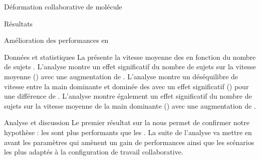 \documentclass[myfrancais,ngerman,english,frenchb]{mythesis}
\begin{document}
\begin{mychapter}{Déformation collaborative de molécule}
\begin{mysection}{Résultats}
\begin{mysubsection}{Amélioration des performances en }
\begin{mysubsubsection}{Données et statistiques}
					La  présente la vitesse moyenne des   en fonction du nombre de sujets .
					L'analyse montre un effet significatif du nombre de sujets  sur la vitesse moyenne  () avec une augmentation de .
					L'analyse montre un déséquilibre de vitesse entre la main dominante et dominée des  avec un effet significatif () pour une différence de .
					L'analyse montre également un effet significatif du nombre de sujets  sur la vitesse moyenne  de la main dominante () avec une augmentation de .
				\end{mysubsubsection}
				\begin{mysubsubsection}{Analyse et discussion}
					Le premier résultat sur la  nous permet de confirmer notre hypothèse  : les  sont plus performants que les .
					La suite de l'analyse va mettre en avant les paramètres qui amènent un gain de performances ainsi que les scénarios les plus adaptés à la configuration de travail collaborative.


\end{mysubsubsection}
\end{mysubsection}
\end{mysection}
\end{mychapter}
\end{document}
